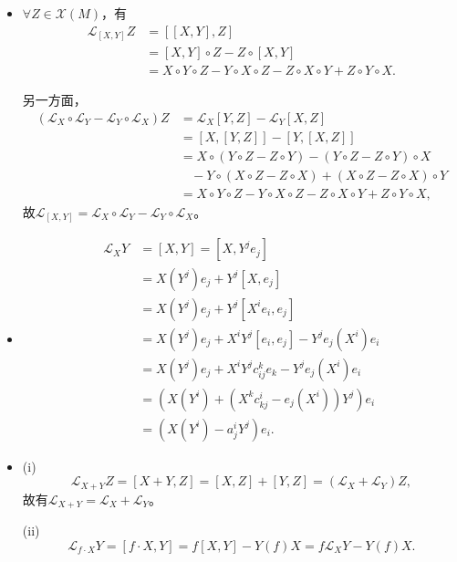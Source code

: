 \begin {itemize}
    \item[22.]
    $\forall Z\in \mathscr{X}(M)$，有
	\begin{align*}
		\mathscr{L}_{[X,Y]}Z&=[[X,Y],Z]\\
		&=[X,Y]\circ Z-Z\circ [X,Y]\\
		&=X\circ Y\circ Z-Y\circ X\circ Z-Z\circ X\circ Y+Z\circ Y\circ X.
	\end{align*}\par
	另一方面，
	\begin{align*}
		(\mathscr{L}_X\circ \mathscr{L}_Y-\mathscr{L}_Y\circ \mathscr{L}_X)Z&=\mathscr{L}_X[Y,Z]-\mathscr{L}_Y[X,Z]\\
		&=[X,[Y,Z]]-[Y,[X,Z]]\\
		&=X\circ (Y\circ Z-Z\circ Y)-(Y\circ Z-Z\circ Y)\circ X\\
		&\ \ \ \ -Y\circ(X\circ Z-Z\circ X)+(X\circ Z-Z\circ X)\circ Y\\
		&=X\circ Y\circ Z-Y\circ X\circ Z-Z\circ X\circ Y+Z\circ Y\circ X,
	\end{align*}
	故$\mathscr{L}_{[X,Y]}=\mathscr{L}_X\circ \mathscr{L}_Y-\mathscr{L}_Y\circ \mathscr{L}_X$。

    \item[23.]
    \begin{align*}
		\mathscr{L}_X Y&=[X,Y]=[X,Y^je_j]\\
		&=X(Y^j)e_j+Y^j[X,e_j]\\
		&=X(Y^j)e_j+Y^j[X^ie_i,e_j]\\
		&=X(Y^j)e_j+X^iY^j[e_i,e_j]-Y^je_j(X^i)e_i\\
		&=X(Y^j)e_j+X^iY^jc^k_{ij}e_k-Y^je_j(X^i)e_i\\
		&=(X(Y^i)+(X^kc^i_{kj}-e_j(X^i))Y^j)e_i\\
		&=(X(Y^i)-a^i_jY^j)e_i.
	\end{align*}

    \item[24.]
    (i)
	\begin{equation*}
		\mathscr{L}_{X+Y}Z=[X+Y,Z]=[X,Z]+[Y,Z]=(\mathscr{L}_X+\mathscr{L}_Y)Z,
	\end{equation*}
	故有$\mathscr{L}_{X+Y}=\mathscr{L}_X+\mathscr{L}_Y$。\par
	(ii)
	\begin{equation*}
		\mathscr{L}_{f\cdot X}Y=[f\cdot X,Y]=f[X,Y]-Y(f)X=f\mathscr{L}_X Y-Y(f)X.
	\end{equation*}


\end{itemize}
